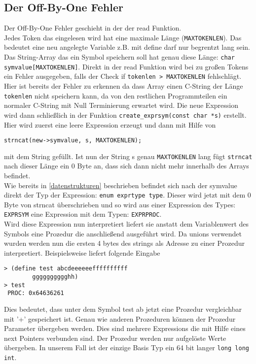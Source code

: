 \subsection{Der Off-By-One Fehler}
\label{luecke}
Der Off-By-One Fehler geschieht in der der read Funktion.\\
 Jedes Token das eingelesen wird hat eine maximale Länge (\texttt{MAXTOKENLEN}). Das bedeutet eine neu angelegte Variable z.B. mit define darf nur begrentzt lang sein.
Das String-Array das ein Symbol speichern soll hat genau diese Länge: \texttt{char symvalue[MAXTOKENLEN]}. Direkt in der read Funktion wird bei zu großen Tokens ein Fehler ausgegeben, falls der Check if \texttt{tokenlen > MAXTOKENLEN} fehlschlägt. 
Hier ist bereits der Fehler zu erkennen da dass Array einen C-String der Länge \texttt{tokenlen} nicht speichern kann, da von den restlichen Programmteilen ein normaler C-String mit Null Terminierung erwartet wird. 
Die neue Expression wird dann schließlich in der Funktion \texttt{create\_exprsym(const char *s)} erstellt. Hier wird zuerst eine leere Expression erzeugt und dann mit Hilfe von 
\begin{lstlisting} 
strncat(new->symvalue, s, MAXTOKENLEN);
\end{lstlisting} mit dem String gefüllt. Ist nun der String s genau \texttt{MAXTOKENLEN} lang fügt \texttt{strncat} nach dieser Länge ein 0 Byte an, dass sich dann nicht mehr innerhalb des Arrays befindet. \\
Wie bereits in \ref{datenstrukturen} beschrieben befindet sich nach der symvalue direkt der Typ der Expression: \texttt{enum exprtype type}. Dieser wird jetzt mit dem 0 Byte von strncat überschrieben und so wird aus einer Expression des Types: \texttt{EXPRSYM} eine Expression mit dem Typen: \texttt{EXPRPROC}.\\
Wird diese Expression nun interpretiert liefert sie anstatt dem Variablenwert des Symbols eine Prozedur die anschließend ausgeführt wird. Da unions verwendet wurden werden nun die ersten 4 bytes des strings als Adresse zu einer Prozedur interpretiert.
Beispielsweise liefert folgende Eingabe
\begin{lstlisting}
> (define test abcdeeeeeeffffffffff
		gggggggggghh)
> test
 PROC: 0x64636261 
\end{lstlisting}
Dies bedeutet, dass unter dem Symbol test ab jetzt eine Prozedur vergleichbar mit '+' gespeichert ist. 
Genau wie anderen Prozeduren können der Prozedur Parameter übergeben werden. 
Dies sind mehrere Expressions die mit Hilfe eines next Pointers verbunden sind. Der Prozedur werden nur aufgelöste Werte übergeben. In unserem Fall ist der einzige Basis Typ ein 64 bit langer \texttt{long long int}. \\
